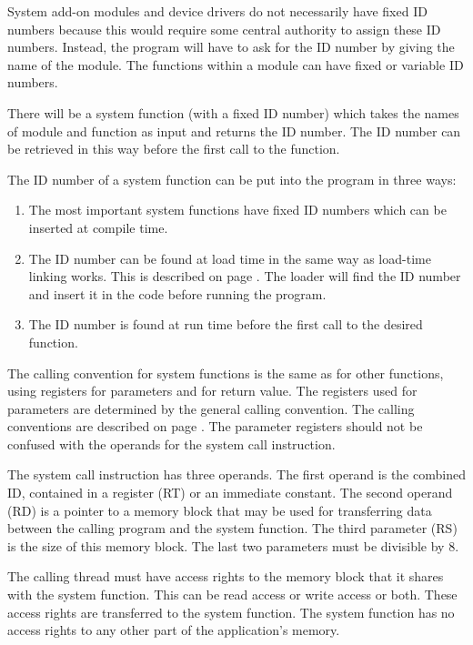 \documentclass[forwardcom.tex]{subfiles}
\begin{document}
System add-on modules and device drivers do not necessarily have fixed ID numbers because this would require some central authority to assign these ID numbers. Instead, the program will have to ask for the ID number by giving the name of the module. The functions within a module can have fixed or variable ID numbers.
\vspace{2mm}

There will be a system function (with a fixed ID number) which takes the names of module and function as input and returns the ID number. The ID number can be retrieved in this way before the first call to the function.
\vspace{2mm}

The ID number of a system function can be put into the program in three ways: 
\begin{enumerate}
\item The most important system functions have fixed ID numbers which can be inserted at compile time. 

\item The ID number can be found at load time in the same way as load-time linking works. This is described on page \pageref{loadTimeLinking}. 
The loader will find the ID number and insert it in the code before running the program. 

\item The ID number is found at run time before the first call to the desired function. 
\end{enumerate}

The calling convention for system functions is the same as for other functions, using registers for parameters and for return value. 
The registers used for parameters are determined by the general calling convention. 
The calling conventions are described on page \pageref{functionCallingConventions}.
The parameter registers should not be confused with the operands for the system call instruction. 
\vspace{2mm}

The system call instruction has three operands. The first operand is the combined ID, contained in a register (RT) or an immediate constant. The second operand (RD) is a pointer to a memory block that may be used for transferring data between the calling program and the system function. The third parameter (RS) is the size of this memory block. The last two parameters must be divisible by 8. 
\vspace{2mm}

The calling thread must have access rights to the memory block that it shares with the system 
function. This can be read access or write access or both. These access rights are transferred to the system function. The system function has no access rights to any other part of the application's memory.
\vspace{2mm}
\end{document}
